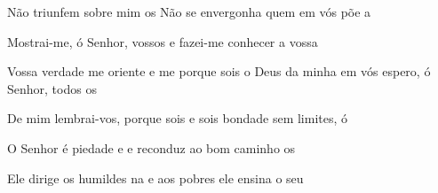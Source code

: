 \begin{multicols}{2}
  \begin{greenumerate}
    \item {}Não triunfem sobre mim os  Não se envergonha quem em vós põe a 

    \item {}Mostrai-me, ó Senhor, vossos  e fazei-me conhecer a vossa 

    \item {}Vossa verdade me oriente e me  porque sois o Deus da minha  em vós espero, ó Senhor, todos os 

    \item {}De mim lembrai-vos, porque sois  e sois bondade sem limites, ó 

    \item {}O Senhor é piedade e  e reconduz ao bom caminho os 

    \item {}Ele dirige os humildes na  e aos pobres ele ensina o seu 
  \end{greenumerate}
\end{multicols}